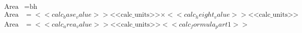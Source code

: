 \hfill
\begin{minipage}{.4\textwidth}
  \begin{align*}
    \text{Area} &= \text{bh} \\
    \text{Area} &= <<calc_base_value>> \text{<<calc_units>>} \times <<calc_height_value>> \text{<<calc_units>>} \\
    \text{Area} &= <<calc_area_value>> \text{<<calc_units>>}<<calc_formula_part1>>
  \end{align*}
\end{minipage}

